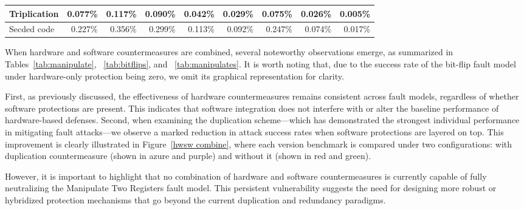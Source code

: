 \begin{table}
\begin{tabular}{lrrrrrrrr}
\hline
Triplication              & 0.077\%                                      & 0.117\%                                       & 0.090\%                                      & 0.042\%                                      & 0.029\%                                      & 0.075\%                                       & 0.026\%                                      & 0.005\%                                       \\
\hline
Secded code               & 0.227\%                                      & 0.356\%                                       & 0.299\%                                      & 0.113\%                                      & 0.092\%                                      & 0.247\%                                       & 0.074\%                                      & 0.017\% \\  
\hline
\end{tabular}
\end{table}

When hardware and software countermeasures are combined, several noteworthy observations emerge, as summarized in Tables~\ref{tab:manipulate}, ~\ref{tab:bitflips}, and ~\ref{tab:manipulates}. It is worth noting that, due to the success rate of the bit-flip fault model under hardware-only protection being zero, we omit its graphical representation for clarity.

First, as previously discussed, the effectiveness of hardware countermeasures remains consistent across fault models, regardless of whether software protections are present. This indicates that software integration does not interfere with or alter the baseline performance of hardware-based defenses. Second, when examining the duplication scheme—which has demonstrated the strongest individual performance in mitigating fault attacks—we observe a marked reduction in attack success rates when software protections are layered on top. This improvement is clearly illustrated in Figure~\ref{hwsw combine}, where each version benchmark is compared under two configurations: with duplication countermeasure (shown in azure and purple) and without it (shown in red and green).

However, it is important to highlight that no combination of hardware and software countermeasures is currently capable of fully neutralizing the Manipulate Two Registers fault model. This persistent vulnerability suggests the need for designing more robust or hybridized protection mechanisms that go beyond the current duplication and redundancy paradigms.


